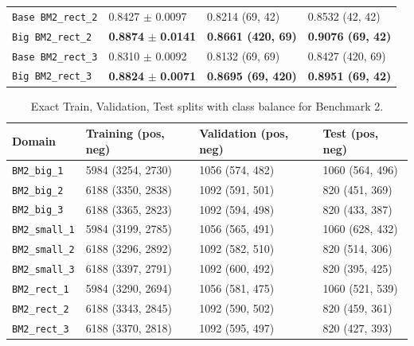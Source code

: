 \begin{table}[htbp]
\begin{tabular}{llll}
        \texttt{Base BM2\_rect\_2} & 0.8427 $\pm$ 0.0097 & 0.8214 (69, 42) & 0.8532 (42, 42)\\
        \texttt{Big BM2\_rect\_2} & \textbf{0.8874} $\pm$ \textbf{0.0141} & \textbf{0.8661 (420, 69)} & \textbf{0.9076 (69, 42)} \\
        \texttt{Base BM2\_rect\_3} & 0.8310 $\pm$ 0.0092 & 0.8132 (69, 69) & 0.8427 (420, 69)\\
        \texttt{Big BM2\_rect\_3} & \textbf{0.8824} $\pm$ \textbf{0.0071} & \textbf{0.8695 (69, 420)} & \textbf{0.8951 (69, 42)} \\
        \bottomrule
    \end{tabular}
\end{table}

\begin{table}[htbp]
    \centering
    \caption{Exact Train, Validation, Test splits with class balance for Benchmark 2.}
    \label{tab:bm2_data_split}
    \begin{tabular}{llll}
        \toprule
        \textbf{Domain} & \textbf{Training (pos, neg)} & \textbf{Validation (pos, neg)} & \textbf{Test (pos, neg)}\\
        \midrule

        \texttt{BM2\_big\_1} & 5984 (3254, 2730) & 1056 (574, 482) & 1060 (564, 496)\\
        \texttt{BM2\_big\_2} & 6188 (3350, 2838) & 1092 (591, 501) & 820 (451, 369)\\
        \texttt{BM2\_big\_3} & 6188 (3365, 2823) & 1092 (594, 498) &  820 (433, 387)\\
        
        \texttt{BM2\_small\_1} & 5984 (3199, 2785) & 1056 (565, 491) & 1060 (628, 432)\\
        \texttt{BM2\_small\_2} & 6188 (3296, 2892) & 1092 (582, 510) & 820 (514, 306)\\
        \texttt{BM2\_small\_3} & 6188 (3397, 2791) & 1092 (600, 492) & 820 (395, 425)\\

        \texttt{BM2\_rect\_1} & 5984 (3290, 2694) & 1056 (581, 475) & 1060 (521, 539)\\
        \texttt{BM2\_rect\_2} & 6188 (3343, 2845) & 1092 (590, 502) & 820 (459, 361)\\
        \texttt{BM2\_rect\_3} & 6188 (3370, 2818) & 1092 (595, 497) & 820 (427, 393)\\
        \bottomrule
    \end{tabular}
\end{table}

